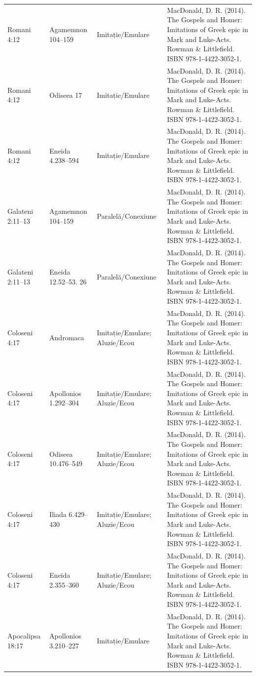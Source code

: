 \documentclass[12pt,a4paper,twoside,openany]{book}
\begin{document}
\begin{longtable}{L{1.4cm}L{1.7cm}L{3.1cm}L{8.4cm}}
Romani 4:12 & Agamemnon 104–159 & Imitație/Emulare & MacDonald, D. R. (2014). The Gospels and Homer: Imitations of Greek epic in Mark and Luke-Acts. Rowman \& Littlefield. ISBN 978-1-4422-3052-1. \\
Romani 4:12 & Odiseea 17 & Imitație/Emulare & MacDonald, D. R. (2014). The Gospels and Homer: Imitations of Greek epic in Mark and Luke-Acts. Rowman \& Littlefield. ISBN 978-1-4422-3052-1. \\
Romani 4:12 & Eneida 4.238–594 & Imitație/Emulare & MacDonald, D. R. (2014). The Gospels and Homer: Imitations of Greek epic in Mark and Luke-Acts. Rowman \& Littlefield. ISBN 978-1-4422-3052-1. \\
Galateni 2:11–13 & Agamemnon 104–159 & Paralelă/Conexiune & MacDonald, D. R. (2014). The Gospels and Homer: Imitations of Greek epic in Mark and Luke-Acts. Rowman \& Littlefield. ISBN 978-1-4422-3052-1. \\
Galateni 2:11–13 & Eneida 12.52–53. 26 & Paralelă/Conexiune & MacDonald, D. R. (2014). The Gospels and Homer: Imitations of Greek epic in Mark and Luke-Acts. Rowman \& Littlefield. ISBN 978-1-4422-3052-1. \\
Coloseni 4:17 & Andromaca & Imitație/Emulare; Aluzie/Ecou & MacDonald, D. R. (2014). The Gospels and Homer: Imitations of Greek epic in Mark and Luke-Acts. Rowman \& Littlefield. ISBN 978-1-4422-3052-1. \\
Coloseni 4:17 & Apollonios 1.292–304 & Imitație/Emulare; Aluzie/Ecou & MacDonald, D. R. (2014). The Gospels and Homer: Imitations of Greek epic in Mark and Luke-Acts. Rowman \& Littlefield. ISBN 978-1-4422-3052-1. \\
Coloseni 4:17 & Odiseea 10.476–549 & Imitație/Emulare; Aluzie/Ecou & MacDonald, D. R. (2014). The Gospels and Homer: Imitations of Greek epic in Mark and Luke-Acts. Rowman \& Littlefield. ISBN 978-1-4422-3052-1. \\
Coloseni 4:17 & Iliada 6.429–430 & Imitație/Emulare; Aluzie/Ecou & MacDonald, D. R. (2014). The Gospels and Homer: Imitations of Greek epic in Mark and Luke-Acts. Rowman \& Littlefield. ISBN 978-1-4422-3052-1. \\
Coloseni 4:17 & Eneida 2.355–360 & Imitație/Emulare; Aluzie/Ecou & MacDonald, D. R. (2014). The Gospels and Homer: Imitations of Greek epic in Mark and Luke-Acts. Rowman \& Littlefield. ISBN 978-1-4422-3052-1. \\
Apocalipsa 18:17 & Apollonios 3.210–227 & Imitație/Emulare & MacDonald, D. R. (2014). The Gospels and Homer: Imitations of Greek epic in Mark and Luke-Acts. Rowman \& Littlefield. ISBN 978-1-4422-3052-1. \\

\end{longtable}
\end{document}
